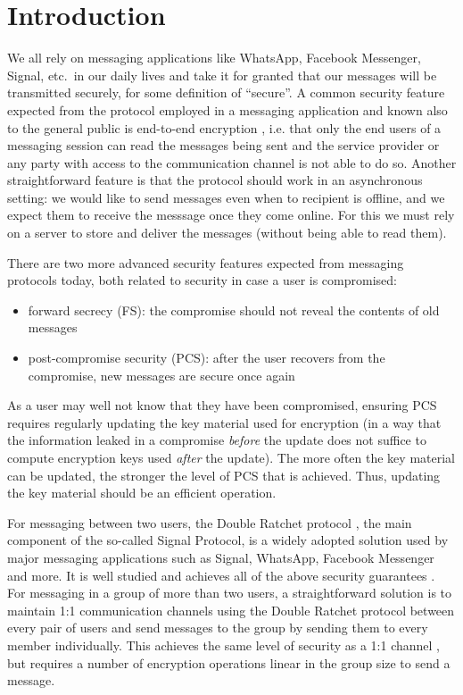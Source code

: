 \chapter{Introduction}

We all rely on messaging applications like WhatsApp, Facebook Messenger, Signal, etc.\ in our daily lives and take it for granted that our messages will be transmitted securely, for some definition of ``secure''. A common security feature expected from the protocol employed in a messaging application and known also to the general public is end-to-end encryption , i.e. that only the end users of a messaging session can read the messages being sent and the service provider or any party with access to the communication channel is not able to do so. Another straightforward feature is that the protocol should work in an asynchronous setting: we would like to send messages even when to recipient is offline, and we expect them to receive the messsage once they come online. For this we must rely on a server to store and deliver the messages (without being able to read them).

There are two more advanced security features expected from messaging protocols today, both related to security in case a user is compromised:
\begin{itemize}
	\item forward secrecy (FS): the compromise should not reveal the contents of old messages
	\item post-compromise security (PCS): after the user recovers from the compromise, new messages are secure once again
\end{itemize}
As a user may well not know that they have been compromised, ensuring PCS requires regularly updating the key material used for encryption (in a way that the information leaked in a compromise \emph{before} the update does not suffice to compute encryption keys used \emph{after} the update). The more often the key material can be updated, the stronger the level of PCS that is achieved. Thus, updating the key material should be an efficient operation.

For messaging between two users, the Double Ratchet protocol \cite{double-ratchet}, the main component of the so-called Signal Protocol, is a widely adopted solution used by major messaging applications such as Signal, WhatsApp, Facebook Messenger and more. It is well studied and achieves all of the above security guarantees \cite{double-ratchet-analysis}. For messaging in a group of more than two users, a straightforward solution is to maintain 1:1 communication channels using the Double Ratchet protocol between every pair of users and send messages to the group by sending them to every member individually. This achieves the same level of security as a 1:1 channel , but requires a number of encryption operations linear in the group size to send a message.

